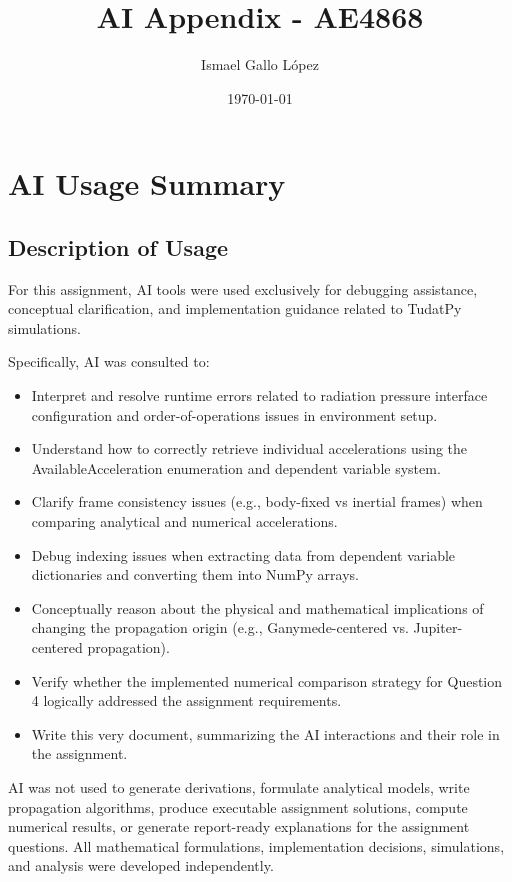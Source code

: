 \documentclass[a4paper,12pt]{article}
\title{AI Appendix - AE4868}
\author{Ismael Gallo López} %
\date{\today}
\begin{document}
\maketitle

\section*{AI Usage Summary}

\subsection*{Description of Usage}

For this assignment, AI tools were used exclusively for debugging assistance, conceptual clarification, and implementation guidance related to TudatPy simulations.

Specifically, AI was consulted to:

\begin{itemize}
  \item Interpret and resolve runtime errors related to radiation pressure interface configuration and order-of-operations issues in environment setup.
  \item Understand how to correctly retrieve individual accelerations using the AvailableAcceleration enumeration and dependent variable system.
  \item Clarify frame consistency issues (e.g., body-fixed vs inertial frames) when comparing analytical and numerical accelerations.
  \item Debug indexing issues when extracting data from dependent variable dictionaries and converting them into NumPy arrays.
  \item Conceptually reason about the physical and mathematical implications of changing the propagation origin (e.g., Ganymede-centered vs. Jupiter-centered propagation).
  \item Verify whether the implemented numerical comparison strategy for Question 4 logically addressed the assignment requirements.
  \item Write this very document, summarizing the AI interactions and their role in the assignment.
\end{itemize}

AI was not used to generate derivations, formulate analytical models, write propagation algorithms, produce executable assignment solutions, compute numerical results, or generate report-ready explanations for the assignment questions. All mathematical formulations, implementation decisions, simulations, and analysis were developed independently.
\end{document}
